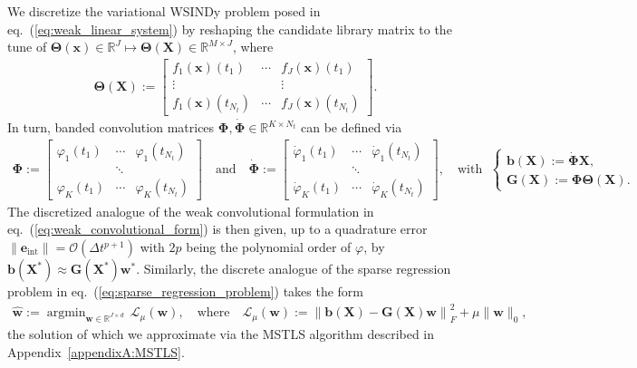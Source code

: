 \documentclass[journal=gmj]{CUP-JNL-DTM}%
\DeclareMathOperator*{\argmin}{argmin}
\theoremstyle{definition}
\numberwithin{equation}{section}
\begin{document}
We discretize the variational WSINDy problem posed in eq.~(\ref{eq:weak_linear_system}) by reshaping the candidate library matrix to the tune of $\mathbf{\Theta}(\boldsymbol{x}) \in \mathbb{R}^J \mapsto \mathbf{\Theta}(\mathbf{X}) \in \mathbb{R}^{M \times J}$, where \begin{align*}
    \mathbf{\Theta}(\mathbf{X})
    := \begin{bmatrix}
        f_1(\boldsymbol{x})(t_1) & \cdots & f_J(\boldsymbol{x})(t_1) \\
        \vdots & & \vdots \\
        f_1(\boldsymbol{x})(t_{N_t}) & \cdots & f_J(\boldsymbol{x})(t_{N_t})
    \end{bmatrix}.
\end{align*} In turn, banded convolution matrices $\mathbf{\Phi}, \dot{\mathbf{\Phi}} \in \mathbb{R}^{K \times {N_t}}$ can be defined via \begin{align*}
    \mathbf{\mathbf{\Phi}} :=
    \begin{bmatrix}
        \varphi_1(t_1) & \cdots & \varphi_1(t_{N_t}) \\
        & \ddots & \\
        \varphi_K(t_1) & \cdots & \varphi_K(t_{N_t})
    \end{bmatrix}
    \quad \text{and} \quad
    \dot{\mathbf{\mathbf{\Phi}}} :=
    \begin{bmatrix}
        \dot{\varphi}_1(t_1) & \cdots & \dot{\varphi}_1(t_{N_t}) \\
        & \ddots & \\
        \dot{\varphi}_K(t_1) & \cdots & \dot{\varphi}_K(t_{N_t})
    \end{bmatrix},
    \quad \text{with} \ \ \,
    \begin{cases}
        \mathbf{b}(\mathbf{X}) := \dot{\mathbf{\mathbf{\Phi}}} \mathbf{X},
        \\
        \mathbf{G}(\mathbf{X}) := \mathbf{\mathbf{\Phi}} \mathbf{\Theta}(\mathbf{X}).
    \end{cases}
\end{align*} The discretized analogue of the weak convolutional formulation in eq.~(\ref{eq:weak_convolutional_form}) is then given, up to a quadrature error $\|\mathbf{e}_{\text{int}}\| = \mathcal{O}(\Delta{t}^{p+1})$ with $2p$ being the polynomial order of $\varphi$, by $\mathbf{b}(\mathbf{X}^*) \approx \mathbf{G}(\mathbf{X}^*)\mathbf{w}^*$. Similarly, the discrete analogue of the sparse regression problem in eq.~(\ref{eq:sparse_regression_problem}) takes the form \begin{align}\label{eq:discrete_weak_form_loss}
    \hat{\mathbf{w}} := \argmin_{\mathbf{w} \in \mathbb{R}^{J \times d}} \, \mathcal{L}_{\mu}(\mathbf{w}),
    \quad \text{where} \quad
    \mathcal{L}_{\mu}(\mathbf{w}) := \left\|\mathbf{b}(\mathbf{X}) - \mathbf{G}(\mathbf{X})\mathbf{w}\right\|^2_F + \mu\|\mathbf{w}\|_0,
\end{align} the solution of which we approximate via the MSTLS algorithm described in Appendix~\ref{appendixA:MSTLS}.
\end{document}
